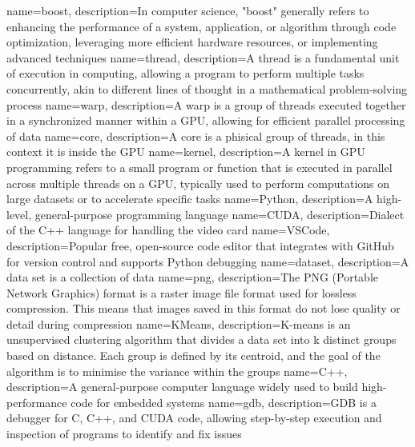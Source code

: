 {
    name=\textnormal{boost},
    description={In computer science, "boost" generally refers to enhancing the performance of a system, application, or algorithm through code optimization, leveraging more efficient hardware resources, or implementing advanced techniques}
}
{
    name=\textnormal{thread},
    description={A thread is a fundamental unit of execution in computing, allowing a program to perform multiple tasks concurrently, akin to different lines of thought in a mathematical problem-solving process}
}
{
    name=\textnormal{warp},
    description={A warp is a group of threads executed together in a synchronized manner within a GPU, allowing for efficient parallel processing of data}
}
{
name=\textnormal{core},
description={A core is a phisical group of threads, in this context it is inside the GPU}
}
{
    name=\textnormal{kernel},
    description={A kernel in GPU programming refers to a small program or function that is executed in parallel across multiple threads on a GPU, typically used to perform computations on large datasets or to accelerate specific tasks}
}
{
    name=\textnormal{Python},
    description={A high-level, general-purpose programming language}
}
{
    name=\textnormal{CUDA},
    description={Dialect of the C++ language for handling the video card}
}
{
name=\textnormal{VSCode},
description={Popular free, open-source code editor that integrates with GitHub for version control and supports Python debugging}
}
{
    name=\textnormal{dataset},
    description={A data set is a collection of data}
}
{
    name=\textnormal{png},
    description={The PNG (Portable Network Graphics) format is a raster image file format used for lossless compression. This means that images saved in this format do not lose quality or detail during compression}
}
{
    name=\textnormal{KMeans},
    description={K-means is an unsupervised clustering algorithm that divides a data set into k distinct groups based on distance. Each group is defined by its centroid, and the goal of the algorithm is to minimise the variance within the groups}
}
{
    name=\textnormal{C++},
    description={A general-purpose computer language widely used to build high-performance code for embedded systems}
}
{
name=\textnormal{gdb},
description={GDB is a debugger for C, C++, and CUDA code, allowing step-by-step execution and inspection of programs to identify and fix issues}
}
